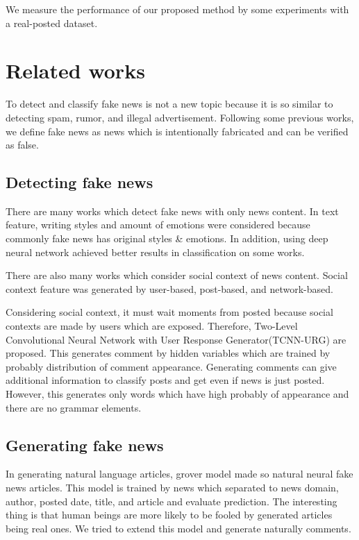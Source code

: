 \documentclass[conference]{IEEEtran}
\begin{document}
We measure the performance of our proposed method by some experiments with a real-posted dataset.

\section{Related works}
To detect and classify fake news is not a new topic because it is so similar to detecting spam\cite{shen2017discovering}, rumor\cite{7023340}, and illegal advertisement\cite{Huang:2017:DFO:3041021.3054233}.
Following some previous works\cite{Shu:2017:FND:3137597.3137600,Ruchansky:2017:CHD:3132847.3132877,Wang:2018:EEA:3219819.3219903}, we define fake news as news which is intentionally fabricated and can be verified as false.

\subsection{Detecting fake news}
There are many works which detect fake news with only news content.
In text feature, writing styles\cite{DBLP:journals/corr/PotthastKRBS17} and amount of emotions\cite{DBLP:journals/corr/abs-1903-01728}
were considered because commonly fake news has original styles \& emotions.
In addition, using deep neural network achieved better results in classification on some works\cite{wang-2017-liar,karimi-tang-2019-learning,karimi-etal-2018-multi}.

There are also many works which consider social context of news content.
Social context feature was generated by user-based\cite{Castillo:2011:ICT:1963405.1963500,8397048,DBLP:journals/corr/abs-1904-13355}, 
post-based\cite{Yang2019UnsupervisedFN,Tacchini2017SomeLI,Jin:2016:NVE:3016100.3016318},
and network-based\cite{Wu:2018:TFF:3159652.3159677,DBLP:journals/corr/abs-1902-06673}.

Considering social context, it must wait moments from posted because social contexts are made by users which are exposed.
Therefore, Two-Level Convolutional Neural Network with User Response Generator(TCNN-URG) are proposed\cite{ijcai2018-533}.
This generates comment by hidden variables which are trained by probably distribution of comment appearance.
Generating comments can give additional information to classify posts and get even if news is just posted.
However, this generates only words which have high probably of appearance and there are no grammar elements.

\subsection{Generating fake news}
\label{subsec:generate}
In generating natural language articles, grover model made so natural neural fake news articles\cite{NIPS2019_9106}.
This model is trained by news which separated to news domain, author, posted date, title, and article and evaluate prediction.
The interesting thing is that human beings are more likely to be fooled by generated articles being real ones.
We tried to extend this model and generate naturally comments.
\end{document}
